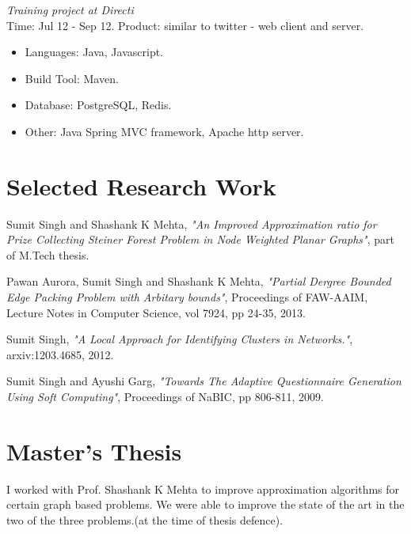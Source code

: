 \documentclass[margin,line]{resume}
\begin{document}
\begin{resume}
\textit{Training project at Directi}\\
Time: Jul 12 - Sep 12.
Product: similar to twitter - web client and server.\\
 \begin{itemize}
\item Languages: Java, Javascript.
\item Build Tool: Maven.
\item Database: PostgreSQL, Redis.
\item Other: Java Spring MVC framework, Apache http server.  
 \end{itemize}



    \section{\mysidestyle Selected Research Work}
\vspace{-2mm}
Sumit Singh and Shashank K Mehta, \textit{ "An Improved Approximation ratio for Prize Collecting Steiner Forest Problem in Node Weighted Planar Graphs"}, part of M.Tech thesis.

\vspace{-2mm}
Pawan Aurora, Sumit Singh and Shashank K Mehta, \textit{"Partial Dergree Bounded Edge Packing Problem with Arbitary bounds"}, Proceedings of FAW-AAIM, Lecture Notes in Computer Science, vol 7924, pp 24-35, 2013. 

\vspace{-2mm}
Sumit Singh, \textit{"A Local Approach for Identifying Clusters in Networks."}, arxiv:1203.4685, 2012.

\vspace{-2mm}
Sumit Singh and Ayushi Garg, \textit{"Towards The Adaptive Questionnaire Generation Using Soft Computing"}, Proceedings of NaBIC, pp 806-811, 2009.



    \section{\mysidestyle Master's Thesis}
I worked with Prof. Shashank K Mehta to improve approximation algorithms for certain graph based problems. We were able to improve the state of the art in  the two of the three problems.(at the time of thesis defence).
   

\end{resume}
\end{document}
